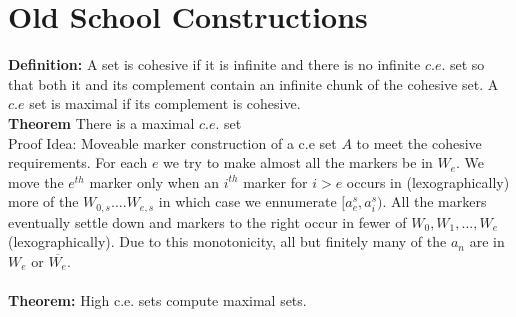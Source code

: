 \documentclass{article}
\begin{document}
	\section{Old School Constructions}
	\textbf{Definition:} A set is cohesive if it is infinite and there is no infinite $c.e.$ set so that both it and its complement contain an infinite chunk of the cohesive set. A $c.e$ set is maximal if its complement is cohesive.\\
	\textbf{Theorem} There is a maximal $c.e.$ set\\
	Proof Idea: Moveable marker construction of a c.e set $A$ to meet the cohesive requirements. For each $e$ we try to make almost all the markers be in $W_e$. We move the $e^{th}$ marker only when an $i^{th}$ marker for $i>e$ occurs in (lexographically) more of the $W_{0,s} .... W_{e,s}$ in which case we ennumerate $[a_e^s,a_i^s)$. All the markers eventually settle down and markers to the right occur in fewer of $W_0,W_1,...,W_e$ (lexographically). Due to this monotonicity, all but finitely many of the $a_n$ are in $W_e$ or $\overline{W_e}$.\\
	\\
	\textbf{Theorem:} High c.e. sets compute maximal sets.\\
	\newpage
\end{document}
